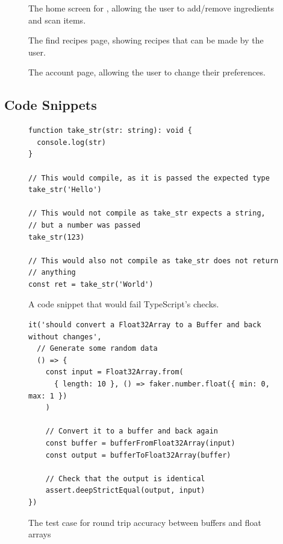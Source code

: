 \begin{figure}[ht]
  \centering
  
  \caption{\label{fig:proto_home}The home screen for \chef{}, allowing the user to add/remove ingredients and scan items.}
\end{figure}

\begin{figure}[ht]
  \centering
  
  \caption{\label{fig:proto_find_recipes}The find recipes page, showing recipes that can be made by the user. }
\end{figure}

\begin{figure}[ht]
  \centering
  
  \caption{\label{fig:proto_account}The account page, allowing the user to change their preferences.}
\end{figure}

\clearpage\subsection{Code Snippets}

\begin{figure}
  \caption{\label{fig:type_check}A code snippet that would fail TypeScript's checks.}
  \begin{verbatim}
function take_str(str: string): void {
  console.log(str)
}

// This would compile, as it is passed the expected type
take_str('Hello')

// This would not compile as take_str expects a string,
// but a number was passed
take_str(123)

// This would also not compile as take_str does not return
// anything
const ret = take_str('World')
  \end{verbatim}
\end{figure}

\begin{figure}[h]
  \centering
  \caption{\label{fig:buffer_float_array}The test case for round trip accuracy between buffers and float arrays}
  \begin{verbatim}
it('should convert a Float32Array to a Buffer and back without changes',
  // Generate some random data
  () => {
    const input = Float32Array.from(
      { length: 10 }, () => faker.number.float({ min: 0, max: 1 })
    )

    // Convert it to a buffer and back again
    const buffer = bufferFromFloat32Array(input)
    const output = bufferToFloat32Array(buffer)

    // Check that the output is identical
    assert.deepStrictEqual(output, input)
})
  \end{verbatim}
\end{figure}


